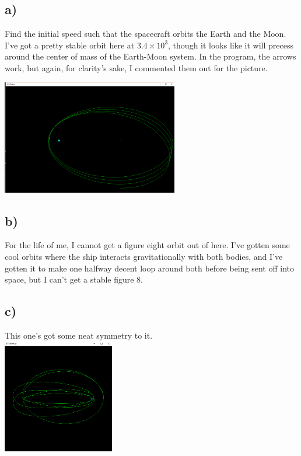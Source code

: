 \documentclass[a4paper,11pt]{article}
\begin{document}
\subsection{a)}

Find the initial speed such that the spacecraft orbits the Earth and the Moon. I've got a pretty stable orbit here at $3.4 \times 10^3$, though it looks like it will precess around the center of mass of the Earth-Moon system. In the program, the arrows work, but again, for clarity's sake, I commented them out for the picture.

\centering
\includegraphics[height=5cm]{Untitled66a.png}
\flushleft{}

\subsection{b)}
For the life of me, I cannot get a figure eight orbit out of here. I've gotten some cool orbits where the ship interacts gravitationally with both bodies, and I've gotten it to make one halfway decent loop around both before being sent off into space, but I can't get a stable figure 8.

\subsection{c)}
This one's got some neat symmetry to it.
\\
\centering
\includegraphics[height=5cm]{Untitled66b.png}
\end{document}
